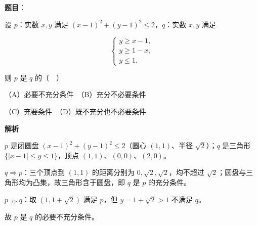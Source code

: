 \begin{answer}

\textbf{题目}：

设 \(p\)：实数 \(x,y\) 满足 \((x-1)^{2}+(y-1)^{2}\leqslant 2\)，\(q\)：实数 \(x,y\) 满足

\nopagebreak[4]
\[
\begin{cases}
y\geqslant x-1,\\
y\geqslant 1-x,\\
y\leqslant 1.
\end{cases}
\]

则 \(p\) 是 \(q\) 的（　）

（A）必要不充分条件　（B）充分不必要条件

（C）充要条件　（D）既不充分也不必要条件

\textbf{解析}

\(p\) 是闭圆盘 \((x-1)^{2}+(y-1)^{2}\leqslant2\)（圆心 \((1,1)\)、半径 \(\sqrt{2}\)）；\(q\) 是三角形 \(\{|x-1|\leqslant y\leqslant1\}\)，顶点 \((1,1)\)、\((0,0)\)、\((2,0)\)。

\(q\Rightarrow p\)：三个顶点到 \((1,1)\) 的距离分别为 \(0,\sqrt{2},\sqrt{2}\)，均不超过 \(\sqrt{2}\)；圆盘与三角形均为凸集，故三角形含于圆盘，即 \(q\) 是 \(p\) 的充分条件。

\(p\nRightarrow q\)：取 \((1,1+\sqrt{2})\) 满足 \(p\)，但 \(y=1+\sqrt{2}>1\) 不满足 \(q\)。

故 \(p\) 是 \(q\) 的必要不充分条件。


\end{answer}
